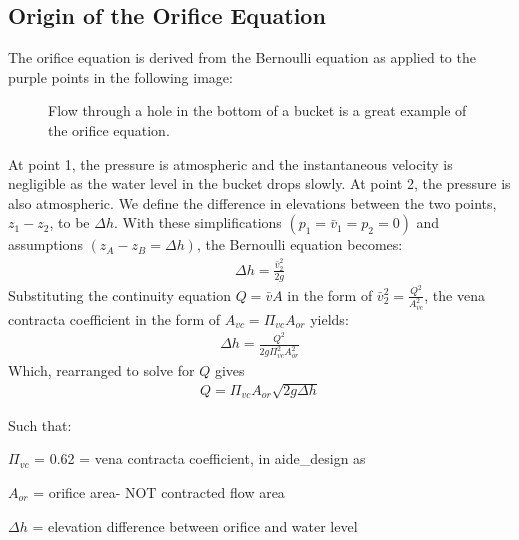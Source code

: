 \documentclass[letterpaper,10pt,english]{sphinxmanual}
\let\sphinxpxdimen\pdfpxdimen\else\newdimen\sphinxpxdimen
\begin{document}
\subsection{Origin of the Orifice Equation}
\label{\detokenize{Fluids_Review/Fluids_Review_Design:origin-of-the-orifice-equation}}
The orifice equation is derived from the Bernoulli equation as applied to the purple points in the following image:

\begin{figure}[htbp]
\centering
\capstart

\noindent\sphinxincludegraphics[width=650\sphinxpxdimen]{{hole_in_a_bucket}.png}
\caption{Flow through a hole in the bottom of a bucket is a great example of the orifice equation.}\label{\detokenize{Fluids_Review/Fluids_Review_Design:id21}}\label{\detokenize{Fluids_Review/Fluids_Review_Design:hole-in-a-bucket}}\end{figure}

At point 1, the pressure is atmospheric and the instantaneous velocity is negligible as the water level in the bucket drops slowly. At point 2, the pressure is also atmospheric. We define the difference in elevations between the two points, \(z_1 - z_2\), to be \(\Delta h\). With these simplifications \((p_1 = \bar v_1 = p_2 = 0)\) and assumptions \((z_A - z_B = \Delta h)\), the Bernoulli equation becomes:
\begin{equation}\label{equation:Fluids_Review/Fluids_Review_Design:Fluids_Review/Fluids_Review_Design:31}
\begin{split}\Delta h = \frac{\bar v_2^2}{2g}\end{split}
\end{equation}
Substituting the continuity equation \(Q = \bar v A\) in the form of \(\bar v_2^2 = \frac{Q^2}{A_{vc}^2}\), the vena contracta coefficient in the form of \(A_{vc} = \Pi_{vc} A_{or}\) yields:
\begin{equation}\label{equation:Fluids_Review/Fluids_Review_Design:Fluids_Review/Fluids_Review_Design:32}
\begin{split}\Delta h = \frac{Q^2}{2g \Pi_{vc}^2 A_{or}^2}\end{split}
\end{equation}
Which, rearranged to solve for \(Q\) gives 
\begin{equation}\label{equation:Fluids_Review/Fluids_Review_Design:orifice_equation}
\begin{split}  Q = \Pi_{vc} A_{or} \sqrt{2g\Delta h}\end{split}
\end{equation}
\begin{DUlineblock}{0em}
\item[] Such that:
\item[] \(\Pi_{vc}\) = 0.62 = vena contracta coefficient, in aide\_design as 
\item[] \(A_{or}\) = orifice area- NOT contracted flow area
\item[] \(\Delta h\) = elevation difference between orifice and water level
\end{DUlineblock}
\end{document}
